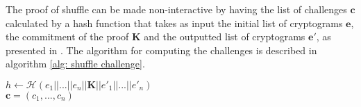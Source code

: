 
\clearpage
The proof of shuffle can be made non-interactive by having the list of challenges $\boldsymbol{c}$ calculated by a hash function that takes as input the initial list of cryptograms $\boldsymbol{e}$, the commitment of the proof $\boldsymbol{K}$ and the outputted list of cryptograms $\boldsymbol{e'}$, as presented in \cite{Furukawa03}. The algorithm for computing the challenges is described in algorithm \ref{alg: shuffle challenge}. 

\begin{algorithm}[!h]
\DontPrintSemicolon
    \caption{\( \mathbf{ShuffleChall} (\boldsymbol{e}, \boldsymbol{e'}, \boldsymbol{K}) \)}
    \( h \gets \mathcal{H} (e_1 || ... || e_n || \boldsymbol{K} || e'_1 || ... || e'_n) \) \\
    \( \boldsymbol{c} = (c_1, ..., c_n) \) \\
     
\end{algorithm}


